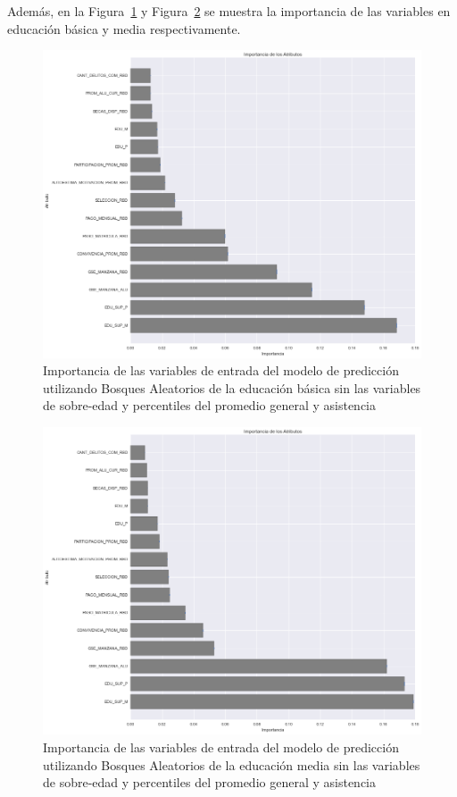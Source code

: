 Además, en la Figura~\ref{fig:impo-basica} y Figura~\ref{fig:impo-media} se muestra la importancia de las variables en educación básica y media respectivamente.

\begin{figure}[H]
  \centering
    \includegraphics[trim=0cm 0cm 0cm 0cm,scale=0.4]{Figuras/7AnalisisResultado/impo-basica.png}
      \caption{Importancia de las variables de entrada del modelo de predicción utilizando Bosques Aleatorios de la educación básica sin las variables de sobre-edad y percentiles del promedio general y asistencia}
    \label{fig:impo-basica}
\end{figure}

\begin{figure}[H]
  \centering
    \includegraphics[trim=0cm 0cm 0cm 0cm,scale=0.4]{Figuras/7AnalisisResultado/impo-media.png}
      \caption{Importancia de las variables de entrada del modelo de predicción utilizando Bosques Aleatorios de la educación media sin las variables de sobre-edad y percentiles del promedio general y asistencia}
    \label{fig:impo-media}
\end{figure}

